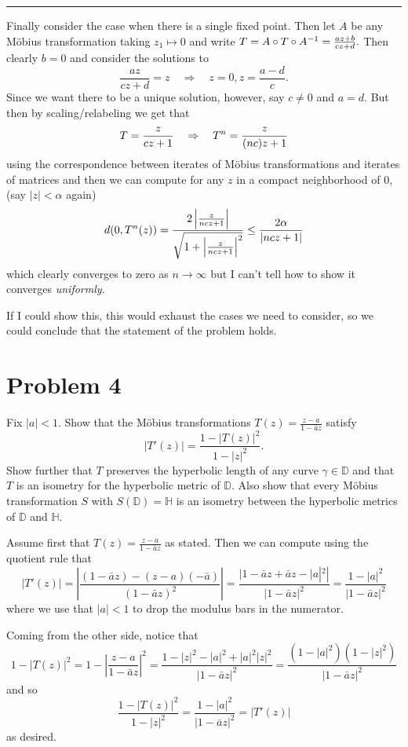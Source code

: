 \documentclass[12pt]{article}
\newcommand*{\brk}{
\rule{2in}{.1pt}
}
\let\tilde\relax
\newcommand*{\tilde}[1]{\widetilde{#1}}
\begin{document}
	\brk
	
	Finally consider the case when there is a single fixed point. Then let $A$ be any M\"obius transformation taking $z_1\mapsto 0$ and write $\tilde T=A\circ T\circ A^{-1}=\frac{az+b}{cz+d}.$ Then clearly $b=0$ and consider the solutions to
	\[\frac{az}{cz+d}=z\quad\Rightarrow\quad z=0,z=\frac{a-d}{c}.\]
	Since we want there to be a unique solution, however, say $c\ne 0$ and $a=d.$ But then by scaling/relabeling we get that 
	\[\tilde T=\frac{z}{cz+1}\quad\Rightarrow\quad \tilde T^n=\frac{z}{(nc)z+1}\]
	using the correspondence between iterates of M\"obius transformations and iterates of matrices and then we can compute for any $z$ in a compact neighborhood of 0, (say $|z|<\alpha$ again)
	\[d(0,\tilde T^n(z))=\frac{2\left|\frac{z}{ncz+1}\right|}{\sqrt{1+\left|\frac{z}{ncz+1}\right|^2}}\le\frac{2\alpha}{|ncz+1|}\]
	which clearly converges to zero as $n\to\infty$ but I can't tell how to show it converges \textit{uniformly.}
	
	If I could show this, this would exhaust the cases we need to consider, so we could conclude that the statement of the problem holds.

\section*{Problem 4}
	\begin{spacing}{1}
		Fix $|a|<1$. Show that the M\"obius transformations $T(z)=\frac{z-a}{1-\bar az}$ satisfy
		\[|T'(z)|=\frac{1-|T(z)|^2}{1-|z|^2}.\]
		Show further that $T$ preserves the hyperbolic length of any curve $\gamma\in\mathbb{D}$ and that $T$ is an isometry for the hyperbolic metric of $\mathbb{D}$. Also show that every M\"obius transformation $S$ with $S(\mathbb{D})=\mathbb{H}$ is an isometry between the hyperbolic metrics of $\mathbb{D}$ and $\mathbb{H}.$
	\end{spacing}	
\noindent\hrulefill
	
	Assume first that $T(z)=\frac{z-a}{1-\bar az}$ as stated. Then we can compute using the quotient rule that
	\[|T'(z)|=\left|\frac{(1-\bar az)-(z-a)(-\bar a)}{(1-\bar az)^2}\right|=\frac{|1-\bar az+\bar az-|a|^2|}{|1-\bar az|^2}=\frac{1-|a|^2}{|1-\bar az|^2}\]
	where we use that $|a|<1$ to drop the modulus bars in the numerator. 
	
	Coming from the other side, notice that
	\[1-|T(z)|^2=1-\left|\frac{z-a}{1-\bar az}\right|^2=\frac{1-|z|^2-|a|^2+|a|^2|z|^2}{|1-\bar az|^2}=\frac{(1-|a|^2)(1-|z|^2)}{|1-\bar az|^2}\]
	and so
	\[\frac{1-|T(z)|^2}{1-|z|^2}=\frac{1-|a|^2}{|1-\bar az|^2}=|T'(z)|\]
	as desired.
	
\end{document}
